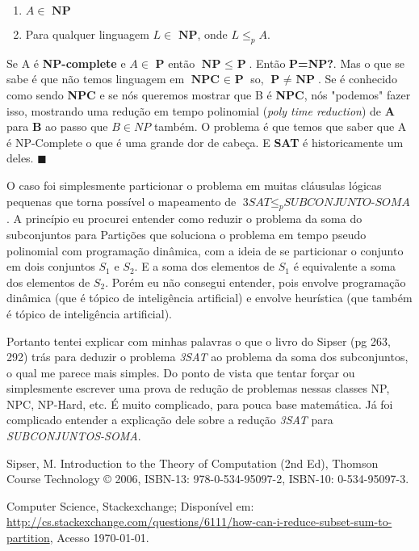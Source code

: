 \documentclass[12pt, a4paper]{article}
\begin{document}
\begin{enumerate}
  \item $A \in \textbf{ NP}$
  \item Para qualquer linguagem $L \in \textbf{ NP}$, onde $L \leqslant_{p} A$.
\end{enumerate}

Se A é \textbf{NP-complete} e $A \in \textbf{ P}$ então $\textbf{NP } \leqslant \textbf{ P}$. Então \textbf{P=NP?}. Mas o que se sabe é que não temos linguagem em  $\textbf{NPC } \in \textbf{ P}$ so, $\textbf{P } \neq \textbf{ NP}$. Se é conhecido como sendo \textbf{NPC} e se nós queremos mostrar que B é \textbf{NPC}, nós "podemos" fazer isso, mostrando uma redução em tempo polinomial (\textit{poly time reduction}) de \textbf{A} para \textbf{B} ao passo que $B \in NP$ também. O problema é que temos que saber que A é NP-Complete o que é uma grande dor de cabeça. E \textbf{SAT} é historicamente um deles. $\blacksquare$

O caso foi simplesmente particionar o problema em muitas cláusulas lógicas pequenas que torna possível o mapeamento de $\textit{3SAT} \leqslant_{p} \textit{SUBCONJUNTO-SOMA}$. A princípio eu procurei entender como reduzir o problema da soma do subconjuntos para Partições que soluciona o problema em tempo pseudo polinomial com programação dinâmica, com a ideia de se particionar o conjunto em dois conjuntos $S_1$ e $S_2$. E a soma dos elementos de $S_1$ é equivalente a soma dos elementos de $S_2$. Porém eu não consegui entender, pois envolve programação dinâmica (que é tópico de inteligência artificial) e envolve heurística (que também é tópico de inteligência artificial).

Portanto tentei explicar com minhas palavras o que o livro do Sipser (pg 263, 292) trás para deduzir o problema \textit{3SAT} ao problema da soma dos subconjuntos, o qual me parece mais simples. Do ponto de vista que tentar forçar ou simplesmente escrever uma prova de redução de problemas nessas classes NP, NPC, NP-Hard, etc. É muito complicado, para pouca base matemática. Já foi complicado entender a explicação dele sobre a redução \textit{3SAT} para \textit{SUBCONJUNTOS-SOMA}.

\pagebreak
\begin{thebibliography}{9}

 Sipser, M. Introduction to the Theory of Computation (2nd Ed), Thomson Course Technology © 2006, ISBN-13: 978-0-534-95097-2, ISBN-10: 0-534-95097-3.

 Computer Science, Stackexchange; Disponível em: \href{http://cs.stackexchange.com/questions/6111/how-can-i-reduce-subset-sum-to-partition}{http://cs.stackexchange.com/questions/6111/how-can-i-reduce-subset-sum-to-partition}, Acesso \today.


\end{thebibliography}
\end{document}
